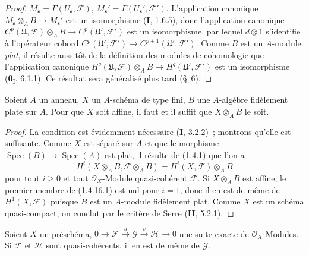 \begin{proof}
$M_{\mathbf s}=\Gamma(U_{\mathbf s},\mathcal F)$,\quad
$M_{\mathbf s}'=\Gamma(U_{\mathbf s}',\mathcal F')$.
L'application canonique
$M_{\mathbf s}\otimes_A B\to M_{\mathbf s}'$ est un isomorphisme
(\textbf{I}, 1.6.5), donc l'application canonique
$C^p(\mathfrak U,\mathcal F)\otimes_A B\to
C^p(\mathfrak U',\mathcal F')$ est un isomorphisme, par lequel
$d\otimes1$ s'identifie à l'opérateur cobord
$C^p(\mathfrak U',\mathcal F')\to C^{p+1}(\mathfrak U',\mathcal F')$.
Comme $B$ est un $A$-module \emph{plat}, il résulte aussitôt de la définition
des modules de cohomologie que l'application canonique
$H^q(\mathfrak U,\mathcal F)\otimes_A B\to
H^q(\mathfrak U',\mathcal F')$ est un isomorphisme
(\textbf{0}\textsubscript{I}, 6.1.1). Ce résultat sera généralisé plus tard (\S~6).
\end{proof}

\begin{corollary}[1.4.16]
\label{III.1.4.16-fr}
Soient $A$ un anneau, $X$ un $A$-schéma de type fini, $B$ une $A$-algèbre
fidèlement plate sur $A$. Pour que $X$ soit affine, il faut et il suffit que
$X\otimes_A B$ le soit.
\end{corollary}

\begin{proof}
La condition est évidemment nécessaire (\textbf{I}, 3.2.2)~; montrons qu'elle est
suffisante. Comme $X$ est séparé sur $A$ et que le morphisme
$\operatorname{Spec}(B)\to\operatorname{Spec}(A)$ est plat, il résulte de
(1.4.1) que l'on a
\begin{equation}
\label{III.1.4.16.1-fr}
\tag{1.4.16.1}
H^i(X\otimes_A B,\mathcal F\otimes_A B)
=H^i(X,\mathcal F)\otimes_A B
\end{equation}
pour tout $i\geq0$ et tout $\mathcal O_X$-Module quasi-cohérent $\mathcal F$.
Si $X\otimes_A B$ est affine, le premier membre de
(\hyperref[III.1.4.16.1-fr]{1.4.16.1}) est nul pour $i=1$, donc il en est de
même de $H^1(X,\mathcal F)$ puisque $B$ est un $A$-module fidèlement plat.
Comme $X$ est un schéma quasi-compact, on conclut par le critère de Serre
(\textbf{II}, 5.2.1).
\end{proof}

\begin{proposition}[1.4.17]
\label{III.1.4.17-fr}
Soient $X$ un préschéma,
$0\to\mathcal F\xrightarrow{u}\mathcal G\xrightarrow{v}\mathcal H\to0$
une suite exacte de $\mathcal O_X$-Modules. Si $\mathcal F$ et $\mathcal H$
sont quasi-cohérents, il en est de même de $\mathcal G$.
\end{proposition}

